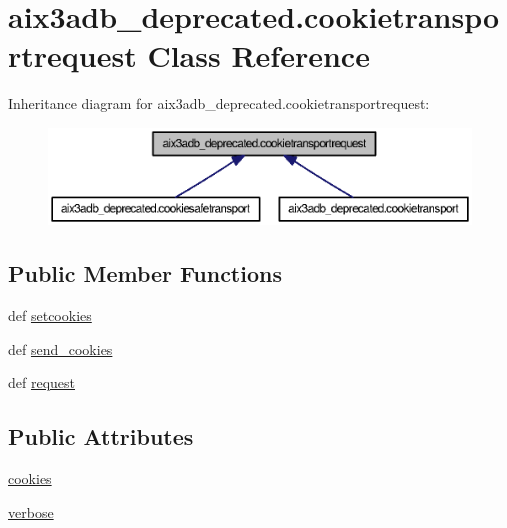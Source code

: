 \section{aix3adb\-\_\-deprecated.\-cookietransportrequest Class Reference}
\label{classaix3adb__deprecated_1_1cookietransportrequest}


Inheritance diagram for aix3adb\-\_\-deprecated.\-cookietransportrequest\-:
\nopagebreak
\begin{figure}[H]
\begin{center}
\leavevmode
\includegraphics[width=350pt]{classaix3adb__deprecated_1_1cookietransportrequest__inherit__graph}
\end{center}
\end{figure}
\subsection*{Public Member Functions}
\begin{DoxyCompactItemize}
\item 
def \hyperlink{classaix3adb__deprecated_1_1cookietransportrequest_acf43b8f249daa9082719e48a1ea44f76}{setcookies}
\item 
def \hyperlink{classaix3adb__deprecated_1_1cookietransportrequest_a4b9a895b37c002bdc485015d03457660}{send\-\_\-cookies}
\item 
def \hyperlink{classaix3adb__deprecated_1_1cookietransportrequest_a35f43ced122820fb822fa1a374e57b29}{request}
\end{DoxyCompactItemize}
\subsection*{Public Attributes}
\begin{DoxyCompactItemize}
\item 
\hyperlink{classaix3adb__deprecated_1_1cookietransportrequest_ae36266a6aa31661800c755fe26803b03}{cookies}
\item 
\hyperlink{classaix3adb__deprecated_1_1cookietransportrequest_a21e8556ecdb0c551303044fe0584f296}{verbose}
\end{DoxyCompactItemize}
